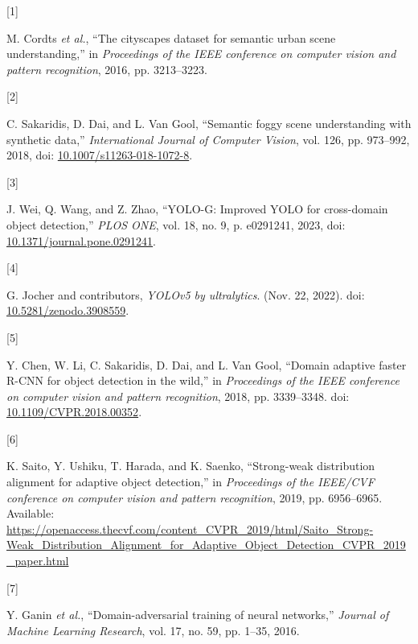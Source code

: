 \documentclass[
  11pt,
]{article}
\newlength{\cslhangindent}
\newlength{\csllabelwidth}
\newlength{\cslentryspacingunit} %
\newenvironment{CSLReferences}[2] %
 {%
  \setlength{\parindent}{0pt}
  \ifodd #1
  \let\oldpar\par
  \def\par{\hangindent=\cslhangindent\oldpar}
  \fi
  \setlength{\parskip}{#2\cslentryspacingunit}
 }%
 {}
\newcommand{\CSLLeftMargin}[1]{\parbox[t]{\csllabelwidth}{#1}}
\newcommand{\CSLRightInline}[1]{\parbox[t]{\linewidth - \csllabelwidth}{#1}\break}
\begin{document}
\hypertarget{refs}{}
\begin{CSLReferences}{0}{0}
\leavevmode{}%
\CSLLeftMargin{{[}1{]} }%
\CSLRightInline{M. Cordts \emph{et al.}, {``The cityscapes dataset for
semantic urban scene understanding,''} in \emph{Proceedings of the IEEE
conference on computer vision and pattern recognition}, 2016, pp.
3213--3223.}

\leavevmode{}%
\CSLLeftMargin{{[}2{]} }%
\CSLRightInline{C. Sakaridis, D. Dai, and L. Van Gool, {``Semantic foggy
scene understanding with synthetic data,''} \emph{International Journal
of Computer Vision}, vol. 126, pp. 973--992, 2018, doi:
\href{https://doi.org/10.1007/s11263-018-1072-8}{10.1007/s11263-018-1072-8}.}

\leavevmode{}%
\CSLLeftMargin{{[}3{]} }%
\CSLRightInline{J. Wei, Q. Wang, and Z. Zhao, {``{YOLO-G}: Improved YOLO
for cross-domain object detection,''} \emph{PLOS ONE}, vol. 18, no. 9,
p. e0291241, 2023, doi:
\href{https://doi.org/10.1371/journal.pone.0291241}{10.1371/journal.pone.0291241}.}

\leavevmode{}%
\CSLLeftMargin{{[}4{]} }%
\CSLRightInline{G. Jocher and contributors, \emph{{YOLOv5} by
ultralytics}. (Nov. 22, 2022). doi:
\href{https://doi.org/10.5281/zenodo.3908559}{10.5281/zenodo.3908559}.}

\leavevmode{}%
\CSLLeftMargin{{[}5{]} }%
\CSLRightInline{Y. Chen, W. Li, C. Sakaridis, D. Dai, and L. Van Gool,
{``Domain adaptive faster {R-CNN} for object detection in the wild,''}
in \emph{Proceedings of the IEEE conference on computer vision and
pattern recognition}, 2018, pp. 3339--3348. doi:
\href{https://doi.org/10.1109/CVPR.2018.00352}{10.1109/CVPR.2018.00352}.}

\leavevmode{}%
\CSLLeftMargin{{[}6{]} }%
\CSLRightInline{K. Saito, Y. Ushiku, T. Harada, and K. Saenko,
{``Strong-weak distribution alignment for adaptive object detection,''}
in \emph{Proceedings of the IEEE/CVF conference on computer vision and
pattern recognition}, 2019, pp. 6956--6965. Available:
\url{https://openaccess.thecvf.com/content_CVPR_2019/html/Saito_Strong-Weak_Distribution_Alignment_for_Adaptive_Object_Detection_CVPR_2019_paper.html}}

\leavevmode{}%
\CSLLeftMargin{{[}7{]} }%
\CSLRightInline{Y. Ganin \emph{et al.}, {``Domain-adversarial training
of neural networks,''} \emph{Journal of Machine Learning Research}, vol.
17, no. 59, pp. 1--35, 2016.}


\end{CSLReferences}
\end{document}
